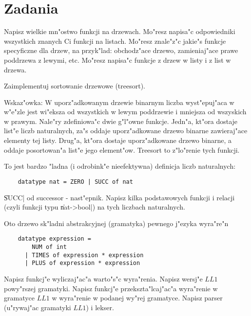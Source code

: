 \section*{Zadania}
\begin{exercises}

\item
Napisz wielkie mn"ostwo funkcji na drzewach.
Mo"resz napisa"c odpowiedniki wszystkich znanych Ci funkcji na listach.
Mo"resz znale"z"c jakie"s funkcje specyficzne dla drzew, 
na przyk"lad: obchodz"ace drzewo, zamieniaj"ace prawe poddrzewa z lewymi, etc.
Mo"resz napisa"c funkcje z drzew w listy i z list w drzewa. 

\item
Zaimplementuj sortowanie drzewowe (treesort).

Wskaz"owka: W uporz"adkowanym drzewie binarnym liczba wyst"epuj"aca w w"e"zle
jest wi"eksza od wszystkich w lewym poddrzewie i mniejsza od wszyskich w prawym.
Nale"ry zdefiniowa"c dwie g"l"owne funkcje. Jedn"a, kt"ora dostaje list"e liczb naturalnych, 
za"s oddaje uporz"adkowane drzewo binarne zawieraj"ace elementy tej listy. 
Drug"a, kt"ora dostaje uporz"adkowane drzewo binarne, a oddaje
posortowan"a list"e jego element"ow. Treesort to z"lo"renie tych funkcji. 



\item
To jest bardzo "ladna (i odrobink"e nieefektywna) definicja liczb naturalnych:
\begin{verbatim} 
    datatype nat = ZERO | SUCC of nat
\end{verbatim}
\|SUCC| od successor - nast"epnik.
Napisz kilka podstawowych funkcji i relacji (czyli funkcji typu \|nat->bool|)
na tych liczbach naturalnych.

\item
Oto drzewo sk"ladni abstrakcyjnej (gramatyka) pewnego j"ezyka wyra"re"n
\begin{verbatim} 
    datatype expression =
        NUM of int
      | TIMES of expression * expression
      | PLUS of expression * expression
\end{verbatim}
Napisz funkcj"e wyliczaj"ac"a warto"s"c wyra"renia.
Napisz wersj"e $LL1$ po\-wy"r\-szej gramatyki.
Napisz funkcj"e przekszta"lcaj"ac"a wyra"renie
w gramatyce $LL1$ w wyra"renie w podanej wy"rej gramatyce.
Napisz parser (u"rywaj"ac gramatyki $LL1$) i lekser.


\end{exercises}
